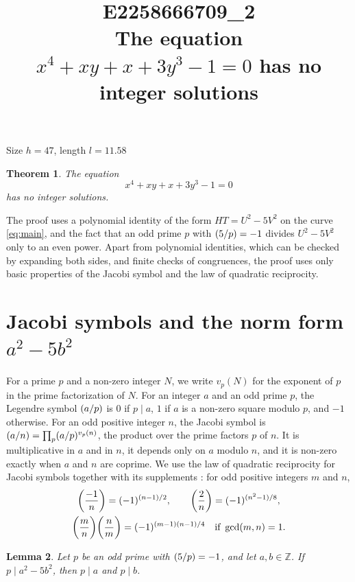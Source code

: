 \documentclass[11pt]{article}
\title{\textbf{E2258666709\_2}\\[4pt] {\Large The equation $x^{4}+xy+x+3y^{3}-1=0$ has no integer solutions}}
\author{}
\date{}
\newtheorem{theorem}{Theorem}
\newtheorem{lemma}[theorem]{Lemma}
\newcommand{\Z}{\mathbb{Z}}
\newcommand{\leg}[2]{\mathchoice{\biggl(\dfrac{#1}{#2}\biggr)}{(#1/#2)}{(#1/#2)}{(#1/#2)}}
\begin{document}
\maketitle
\vspace{-8ex}
\begin{center}
Size $h=47$, length $l=11.58$
\end{center}

\begin{theorem}\label{thm:main}
The equation
\begin{equation}\label{eq:main}
x^{4}+xy+x+3y^{3}-1=0
\end{equation}
has no integer solutions.
\end{theorem}

The proof uses a polynomial identity of the form $HT=U^2-5V^2$ on the curve \eqref{eq:main}, and the fact that an odd prime $p$ with $\leg{5}{p}=-1$ divides $U^2-5V^2$ only to an even power. Apart from polynomial identities, which can be checked by expanding both sides, and finite checks of congruences, the proof uses only basic properties of the Jacobi symbol and the law of quadratic reciprocity.

\section{\texorpdfstring{Jacobi symbols and the norm form $a^2-5b^2$}{Jacobi symbols and the norm form}}

For a prime $p$ and a non-zero integer $N$, we write $v_p(N)$ for the exponent of $p$ in the prime factorization of $N$. For an integer $a$ and an odd prime $p$, the Legendre symbol $\leg{a}{p}$ is $0$ if $p\mid a$, $1$ if $a$ is a non-zero square modulo $p$, and $-1$ otherwise. For an odd positive integer $n$, the Jacobi symbol is $\leg{a}{n}=\prod_p\leg{a}{p}^{v_p(n)}$, the product over the prime factors $p$ of $n$. It is multiplicative in $a$ and in $n$, it depends only on $a$ modulo $n$, and it is non-zero exactly when $a$ and $n$ are coprime. We use the law of quadratic reciprocity for Jacobi symbols together with its supplements \cite[Chapter~5, \S2]{IR}: for odd positive integers $m$ and $n$,
\begin{gather*}
\leg{-1}{n}=(-1)^{(n-1)/2},\qquad\leg{2}{n}=(-1)^{(n^2-1)/8},\\
\leg{m}{n}\leg{n}{m}=(-1)^{(m-1)(n-1)/4}\quad\text{if }\gcd(m,n)=1.
\end{gather*}

\begin{lemma}\label{lem:divides}
Let $p$ be an odd prime with $\leg{5}{p}=-1$, and let $a,b\in\Z$. If $p\mid a^2-5b^2$, then $p\mid a$ and $p\mid b$.
\end{lemma}
\end{document}
